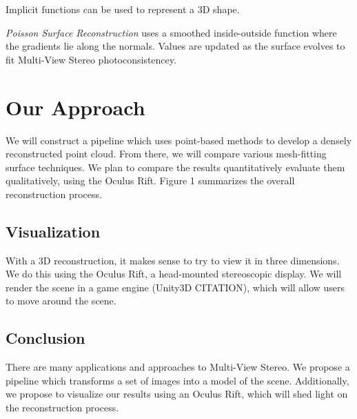 \documentclass[10pt,twocolumn,letterpaper]{article}
\begin{document}
Implicit functions can be used to represent a 3D shape.    

\textit{Poisson Surface Reconstruction} uses a smoothed inside-outside function where the gradients lie along the normals. Values are updated as the surface evolves to fit Multi-View Stereo photoconsistencey. 


\section{Our Approach}

We will construct a pipeline which uses point-based methods to develop a densely reconstructed point cloud. From there, we will compare various mesh-fitting surface techniques.  We plan to compare the results quantitatively evaluate them qualitatively, using the Oculus Rift.  Figure 1 summarizes the overall reconstruction process.

\subsection{Visualization}
With a 3D reconstruction, it makes sense to try to view it in three dimensions. We do this using the Oculus Rift, a head-mounted stereoscopic display. We will render the scene in a game engine (Unity3D CITATION), which will allow users to move around the scene.

\subsection{Conclusion}
There are many applications and approaches to Multi-View Stereo. We propose a pipeline which transforms a set of images into a model of the scene.  Additionally, we propose to visualize our results using an Oculus Rift, which will shed light on the reconstruction process.



{\small
  
  
}
\end{document}
